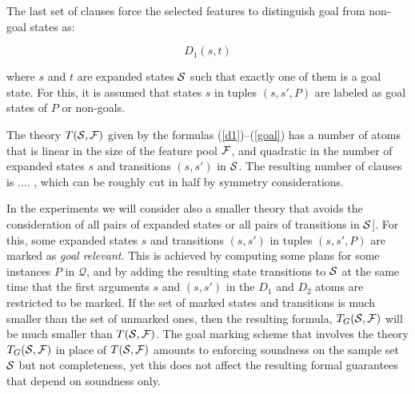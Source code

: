 \documentclass[letterpaper]{article} %
\newcommand{\Omit}[1]{}
\newcommand{\Q}{\mathcal{Q}}
\begin{document}
\Omit{ %
  Refer to this as an ``efficiency optimization'' ..
  
  such that $s < t$, and transition $(s,s')$ in ${\cal S}$. Due to the symmetry breaking caused by the constraint $s < t$,
  the following formulas are also needed

\begin{equation}
  \neg D_1(s, t) \, \Rightarrow \, \bigvee_{s'} \neg D_2(s, s', t, t')
    \label{bridge2}
\end{equation}

\noindent where the  iteration in the right hand disjunction goes over the different successor states $s'$ of the first argument
$s$ of $D_1$ that are in the sample set ${\cal S}$, $s$ and $t$ are states in ${\cal S}_1$ as before with $s < t$, and $t'$ is a
successor state of $t$ in ${\cal S}$; i.e. $(t,t') \in {\cal S}$.
}


The last  set of clauses force the selected features to distinguish goal from non-goal states as:

\begin{equation}
  D_1(s,t) 
\label{goal}
\end{equation}

\noindent where  $s$ and $t$  are expanded states  ${\cal S}$ such that exactly one of them is a goal state. 
For this, it is assumed that  states $s$ in   tuples $(s,s',P)$ are labeled as   goal states  of $P$ or non-goals.

The theory $T({\cal S},{\cal F})$ given by the formulas  (\ref{d1})--(\ref{goal})
has a number of atoms that is linear in the size of the feature pool $\cal F$,
and quadratic in the number of expanded  states $s$  and transitions $(s,s')$ in ${\cal S}$.
The resulting number of clauses is ....  , which can be roughly cut in half by  symmetry considerations.

In the experiments we will   consider also  a smaller theory  that avoids the consideration of all pairs
of expanded states or all pairs of transitions in $\cal S$]. For this, some expanded states $s$ and transitions $(s,s')$ in
tuples $(s,s',P)$ are marked as \emph{goal relevant}. This is achieved by computing some plans for some instances $P$ in $\Q$, 
and by adding the resulting state transitions to ${\cal S}$ at the same time that the first
arguments $s$ and $(s,s')$ in the  $D_1$ and $D_2$ atoms are restricted to be marked.
If the set of marked states and transitions is much smaller than the set of unmarked ones, 
then the resulting formula,  $T_G({\cal S},{\cal F})$ will be much smaller than $T({\cal S},{\cal F})$.
The goal marking scheme that involves the theory $T_G({\cal S},{\cal F})$ in place of $T({\cal S},{\cal F})$
amounts to enforcing soundness on  the sample set ${\cal S}$ but not completeness, yet this does
not affect the resulting  formal guarantees that depend on soundness only. 
\end{document}
